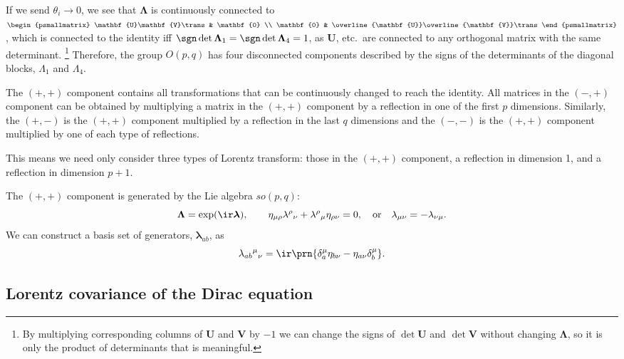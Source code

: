 \documentclass[11pt]{article}
\newcommand{\U}{\mathbf{U}}
\newcommand{\V}{\mathbf{V}}
\newcommand{\Ub}{\overline{\U}}
\newcommand{\Vb}{\overline{\V}}
\newcommand{\Lambdab}{\boldsymbol{\Lambda}}
\newcommand{\lambdab}{\boldsymbol{\lambda}}
\begin{document}
If we send \(\theta_i \to 0\), we see that \(\Lambdab\) is continuously connected to
\(
\begin{psmallmatrix}
  \U\V\trans & \mathbf{0} \\
  \mathbf{0} & \Ub\Vb\trans
\end{psmallmatrix}
\),
which is connected to the identity iff \(\sgn \det \Lambdab_1 = \sgn \det \Lambdab_4 = 1\), 
as \(\U\), etc.\ are connected to any orthogonal matrix with the same determinant.%
\footnote{By multiplying corresponding columns of \(\U\) and \(\V\) by \(-1\) we can change the signs of \(\det\U\) and \(\det\V\) without changing \(\Lambdab\), so it is only the product of determinants that is meaningful.}
Therefore, the group \(O(p,q)\) has four disconnected components described by the signs of the determinants of the diagonal blocks, \(\Lambda_1\) and  \(\Lambda_4\).

The \((+,+)\) component contains all transformations that can be continuously changed to reach the identity.
All matrices in the \((-,+)\) component can be obtained by multiplying a matrix in the \((+,+)\) component by a reflection in one of the first \(p\) dimensions.
Similarly, the \((+,-)\) is the \((+,+)\) component multiplied by a reflection in the last \(q\) dimensions and the \((-,-)\) is the \((+,+)\) component multiplied by one of each type of reflections.

This means we need only consider three types of Lorentz transform: those in the \((+,+)\) component, a reflection in dimension 1, and a reflection in dimension \(p+1\).

The \((+,+)\) component is generated by the Lie algebra \(so(p,q)\):
%
\begin{equation}\label{eq:lielorentz}
  \Lambdab = \exp(\ir\lambdab),
  \qquad
  \eta_{\mu\rho} \lambda^\rho{}_\nu +  \lambda^\rho{}_\mu \eta_{\rho\nu} = 0,
  \quad \text{or} \quad
  \lambda_{\mu\nu} = - \lambda_{\nu\mu}.
\end{equation}
%
We can construct a basis set of generators, \(\lambdab_{ab}\), as
%
\begin{equation}\label{eq:genlorentz}
  \lambda_{ab}{}^\mu{}_\nu = \ir \prn{\delta^\mu_a \eta_{b\nu} - \eta_{a\nu} \delta^\mu_b}.
\end{equation}
%


\subsection{Lorentz covariance of the Dirac equation}\label{sec:diraclorentz}
\end{document}
